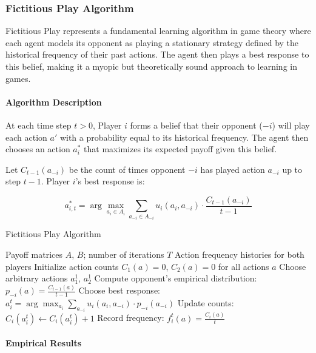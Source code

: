 \documentclass[conference]{IEEEtran}
\begin{document}
\subsubsection{Fictitious Play Algorithm}

Fictitious Play represents a fundamental learning algorithm in game theory where each agent models its opponent as playing a stationary strategy defined by the historical frequency of their past actions. The agent then plays a best response to this belief, making it a myopic but theoretically sound approach to learning in games.

\paragraph{Algorithm Description}

At each time step $t > 0$, Player $i$ forms a belief that their opponent ($-i$) will play each action $a'$ with a probability equal to its historical frequency. The agent then chooses an action $a_i^*$ that maximizes its expected payoff given this belief.

Let $C_{t-1}(a_{-i})$ be the count of times opponent $-i$ has played action $a_{-i}$ up to step $t-1$. Player $i$'s best response is:

\begin{equation}
a_{i,t}^* = \arg\max_{a_i \in A_i} \sum_{a_{-i} \in A_{-i}} u_i(a_i, a_{-i}) \cdot \frac{C_{t-1}(a_{-i})}{t-1}
\end{equation}

\begin{algorithm}[h!]
\caption{Fictitious Play Algorithm}
\begin{algorithmic}[1]
\REQUIRE Payoff matrices $A$, $B$; number of iterations $T$
\ENSURE Action frequency histories for both players
\STATE Initialize action counts $C_1(a) = 0$, $C_2(a) = 0$ for all actions $a$
        \STATE Choose arbitrary actions $a_1^1$, $a_2^1$
    \ELSE
        \STATE Compute opponent's empirical distribution: $p_{-i}(a) = \frac{C_{t-1}(a)}{t-1}$
        \STATE Choose best response: $a_i^t = \arg\max_{a_i} \sum_{a_{-i}} u_i(a_i, a_{-i}) \cdot p_{-i}(a_{-i})$
    \ENDIF
    \STATE Update counts: $C_i(a_i^t) \leftarrow C_i(a_i^t) + 1$
    \STATE Record frequency: $f_i^t(a) = \frac{C_i(a)}{t}$
\ENDFOR
\end{algorithmic}
\label{alg:fictitious_play}
\end{algorithm}

\paragraph{Empirical Results}
\end{document}
